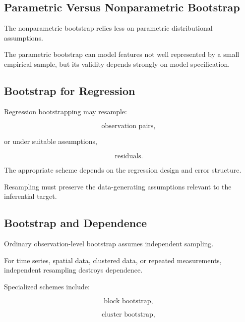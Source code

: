 \subsection{Parametric Versus Nonparametric Bootstrap}
\label{subsec:parametric-versus-nonparametric-bootstrap}

The nonparametric bootstrap relies less on parametric distributional
assumptions.

The parametric bootstrap can model features not well represented by a
small empirical sample, but its validity depends strongly on model
specification.

\subsection{Bootstrap for Regression}
\label{subsec:bootstrap-regression}

Regression bootstrapping may resample:

\[
\boxed{
\text{observation pairs},
}
\]

or under suitable assumptions,

\[
\boxed{
\text{residuals}.
}
\]

The appropriate scheme depends on the regression design and error
structure.

Resampling must preserve the data-generating assumptions relevant to the
inferential target.

\subsection{Bootstrap and Dependence}
\label{subsec:bootstrap-dependence}

Ordinary observation-level bootstrap assumes independent sampling.

For time series, spatial data, clustered data, or repeated measurements,
independent resampling destroys dependence.

Specialized schemes include:

\[
\boxed{
\text{block bootstrap},
}
\]

\[
\boxed{
\text{cluster bootstrap},
}
\]

